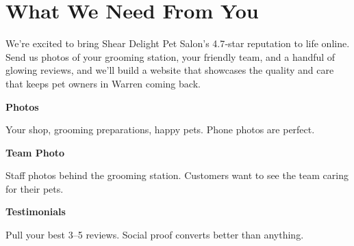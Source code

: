 \documentclass[11pt,letterpaper]{article}
\begin{document}
\vspace{0.2em}

\section*{What We Need From You}

We’re excited to bring Shear Delight Pet Salon’s 4.7‑star reputation to life online. Send us photos of your grooming station, your friendly team, and a handful of glowing reviews, and we’ll build a website that showcases the quality and care that keeps pet owners in Warren coming back.

\vspace{0.12em}

\noindent\begin{minipage}[t]{0.48\textwidth}
\begin{tcolorbox}[colframe=accent-teal, boxrule=1pt, left=0.7em, right=0.7em, top=0.5em, bottom=0.5em, arc=4pt, boxsep=0pt]
{\bfseries\small\color{accent-teal}Photos}

\vspace{0.15em}

{\small Your shop, grooming preparations, happy pets. Phone photos are perfect.}
\end{tcolorbox}

\vspace{0.1em}

\begin{tcolorbox}[colframe=accent-teal, boxrule=1pt, left=0.7em, right=0.7em, top=0.5em, bottom=0.5em, arc=4pt, boxsep=0pt]
{\bfseries\small\color{accent-teal}Team Photo}

\vspace{0.15em}

{\small Staff photos behind the grooming station. Customers want to see the team caring for their pets.}
\end{tcolorbox}

\vspace{0.1em}

\begin{tcolorbox}[colframe=accent-teal, boxrule=1pt, left=0.7em, right=0.7em, top=0.5em, bottom=0.5em, arc=4pt, boxsep=0pt]
{\bfseries\small\color{accent-teal}Testimonials}

\vspace{0.15em}

{\small Pull your best 3--5 reviews. Social proof converts better than anything.}
\end{tcolorbox}
\end{minipage}
\end{document}

